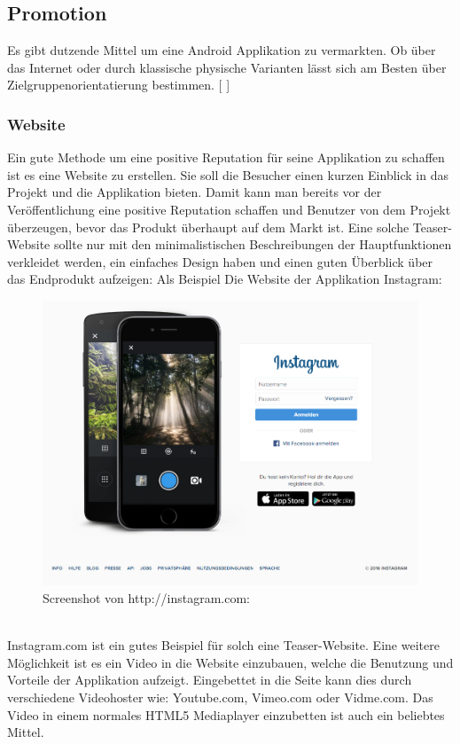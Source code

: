 \documentclass[FIPLY_base.tex]{subfiles}
\begin{document}
\subsection{Promotion}
Es gibt dutzende Mittel um eine Android Applikation zu vermarkten. Ob über das Internet oder durch klassische physische Varianten lässt sich am Besten über Zielgruppenorientatierung bestimmen. 
[ \cite{promteil1}]

\subsubsection{Website}
Ein gute Methode um eine positive Reputation für seine Applikation zu schaffen ist es eine Website zu erstellen. Sie soll die Besucher einen kurzen Einblick in das Projekt und die Applikation bieten. Damit kann man bereits vor der Veröffentlichung eine positive Reputation schaffen und Benutzer von dem Projekt überzeugen, bevor das Produkt überhaupt auf dem Markt ist. Eine solche Teaser-Website sollte nur mit den minimalistischen Beschreibungen der Hauptfunktionen verkleidet werden, ein einfaches Design haben und einen guten Überblick über das Endprodukt aufzeigen: Als Beispiel Die Website der Applikation Instagram:

\begin{figure}[H]
	\centering
	\includegraphics[scale=0.3]{img/instagramdotcom}
	\caption{Screenshot von http://instagram.com:}
\end{figure}
\ \\
Instagram.com ist ein gutes Beispiel für solch eine Teaser-Website. 
Eine weitere Möglichkeit ist es ein Video in die Website einzubauen, welche die Benutzung und Vorteile der Applikation aufzeigt. Eingebettet in die Seite kann dies durch verschiedene Videohoster wie: Youtube.com, Vimeo.com oder Vidme.com. Das Video in einem normales HTML5 Mediaplayer einzubetten ist auch ein beliebtes Mittel.
\end{document}

